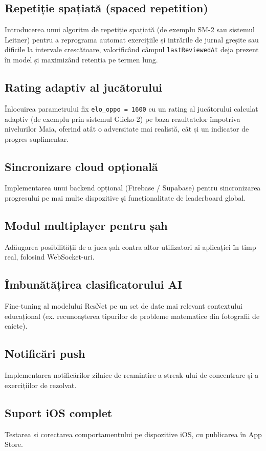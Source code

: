 \documentclass[12pt, a4paper, twoside]{report}
\numberwithin{equation}{section}
\begin{document}
\subsection{Repetiție spațiată (spaced repetition)}
Introducerea unui algoritm de repetiție spațiată (de exemplu SM-2 sau sistemul Leitner)
pentru a reprograma automat exercițiile și intrările de jurnal greșite sau dificile la
intervale crescătoare, valorificând câmpul \texttt{lastReviewedAt} deja prezent în model
și maximizând retenția pe termen lung.

\subsection{Rating adaptiv al jucătorului}
Înlocuirea parametrului fix \texttt{elo\_oppo = 1600} cu un rating al jucătorului calculat
adaptiv (de exemplu prin sistemul Glicko-2) pe baza rezultatelor împotriva nivelurilor Maia,
oferind atât o adversitate mai realistă, cât și un indicator de progres suplimentar.

\subsection{Sincronizare cloud opțională}
Implementarea unui backend opțional (Firebase / Supabase) pentru sincronizarea
progresului pe mai multe dispozitive și funcționalitate de leaderboard global.

\subsection{Modul multiplayer pentru șah}
Adăugarea posibilității de a juca șah contra altor utilizatori ai aplicației în timp
real, folosind WebSocket-uri.

\subsection{Îmbunătățirea clasificatorului AI}
Fine-tuning al modelului ResNet pe un set de date mai relevant contextului educațional
(ex. recunoașterea tipurilor de probleme matematice din fotografii de caiete).

\subsection{Notificări push}
Implementarea notificărilor zilnice de reamintire a streak-ului de concentrare și a
exercițiilor de rezolvat.

\subsection{Suport iOS complet}
Testarea și corectarea comportamentului pe dispozitive iOS, cu publicarea în App Store.
\end{document}
